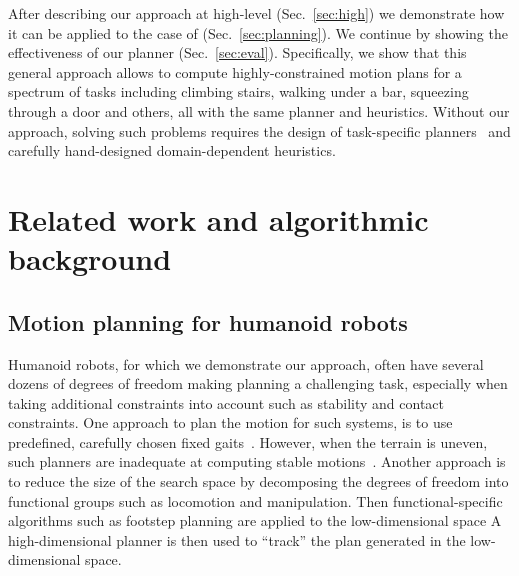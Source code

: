 \documentclass{article}
\begin{document}
%



After describing our approach at high-level (Sec.~\ref{sec:high}) we demonstrate how it can be applied to the case of \mhastar (Sec.~\ref{sec:planning}).
We continue by showing the effectiveness of our planner (Sec.~\ref{sec:eval}).
Specifically, we show that this general approach allows to compute highly-constrained motion plans for a spectrum of tasks including climbing stairs, walking under a bar, squeezing through a door and others, all with the same planner and heuristics.  
Without our approach, solving such problems requires the design of task-specific planners~\cite{KKKHKHAI04} and carefully hand-designed domain-dependent heuristics.


\section{Related work and algorithmic background}
\subsection{Motion planning for humanoid robots}
\label{sec:rel}
Humanoid robots, for which we demonstrate our approach, often have several dozens of degrees of freedom making planning a challenging task, especially when taking additional constraints into account such as stability and contact constraints.
One approach to plan the motion for such systems, is to use predefined, carefully chosen fixed gaits~\cite{KKKHKHAI04}. 
However, when the terrain is uneven, such planners are inadequate at computing stable motions~\cite{HBLHW08}.
Another approach is to reduce the size of the search space by decomposing the degrees of freedom into functional groups such as locomotion and manipulation.
Then functional-specific algorithms such as footstep planning are applied to the low-dimensional space 
A high-dimensional planner is then used to ``track'' the plan generated in the low-dimensional space.
\end{document}
